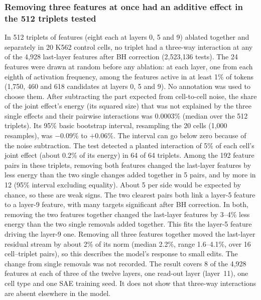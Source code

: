 \subsubsection*{Removing three features at once had an additive effect in the 512 triplets tested}
In 512 triplets of features (eight each at layers 0, 5 and 9) ablated
together and separately in 20 K562 control cells, no triplet had a
three-way interaction at any of the 4,928 last-layer features after BH
correction (2,523,136 tests). The 24 features were drawn at random before
any ablation: at each layer, one from each eighth of activation
frequency, among the features active in at least 1\% of tokens (1,750,
460 and 618 candidates at layers 0, 5 and 9). No annotation was used to
choose them. After subtracting the part expected from cell-to-cell
noise, the share of the joint effect's energy (its squared size) that
was not explained by the three single effects and their pairwise
interactions was 0.0003\% (median over the 512 triplets). Its 95\% basic
bootstrap interval, resampling the 20 cells (1,000 resamples), was
$-0.09\%$ to $+0.06\%$. The interval can go below zero because of the
noise subtraction. The test detected a planted interaction of 5\% of each
cell's joint effect (about 0.2\% of its energy) in 64 of 64 triplets.
Among the 192 feature pairs in these triplets, removing both features
changed the last-layer features by less energy than the two single
changes added together in 5 pairs, and by more in 12 (95\% interval
excluding equality). About 5 per side would be expected by chance, so
these are weak signs. The two clearest pairs both link a layer-5 feature to a layer-9 feature,
with many targets significant after BH correction. In both, removing the
two features together changed the last-layer features by 3--4\% less
energy than the two single removals added together. This fits the
layer-5 feature driving the layer-9 one. Removing all three features together moved the
last-layer residual stream by about 2\% of its norm (median 2.2\%, range
1.6--4.1\%, over 16 cell--triplet pairs), so this describes the model's
response to small edits. The change from single removals was not
recorded. The result covers 8 of the 4,928 features at each of three of
the twelve layers, one read-out layer (layer~11), one cell type and one
SAE training seed. It does not show that three-way interactions are
absent elsewhere in the model.

